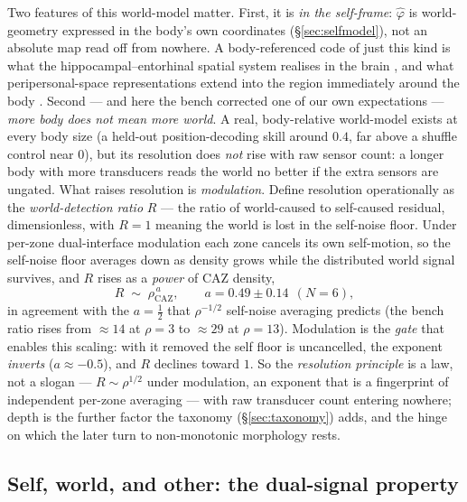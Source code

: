 \documentclass{article}
\begin{document}
Two features of this world-model matter.  First, it is \emph{in the
self-frame}: $\hat\varphi$ is world-geometry expressed in the body's own
coordinates (\S\ref{sec:selfmodel}), not an absolute map read off from
nowhere.  A body-referenced code of just this kind is what the
hippocampal--entorhinal spatial system realises in the brain
\citep{OKeefeNadel1978CognitiveMap,MoserKropffMoser2008SpatialSystem}, and
what peripersonal-space representations extend into the region immediately
around the body \citep{GrazianoCooke2006PersonalSpace}.  Second --- and here the bench corrected one of our own
expectations --- \emph{more body does not mean more world}.  A real,
body-relative world-model exists at every body size (a held-out
position-decoding skill around $0.4$, far above a shuffle control near
$0$), but its resolution does \emph{not} rise with raw sensor count: a
longer body with more transducers reads the world no better if the extra
sensors are ungated.  What raises resolution is \emph{modulation}.  Define resolution
operationally as the \emph{world-detection ratio} $R$ --- the ratio of
world-caused to self-caused residual, dimensionless, with $R{=}1$ meaning
the world is lost in the self-noise floor.  Under per-zone dual-interface
modulation each zone cancels its own self-motion, so the self-noise floor
averages down as density grows while the distributed world signal
survives, and $R$ rises as a \emph{power} of CAZ density,
\begin{equation}
R \;\sim\; \rho_{\mathrm{CAZ}}^{\,a},
\qquad a = 0.49 \pm 0.14\ \ (N{=}6),
\label{eq:resolution}
\end{equation}
in agreement with the $a{=}\tfrac12$ that $\rho^{-1/2}$ self-noise
averaging predicts (the bench ratio rises from $\approx\!14$ at
$\rho{=}3$ to $\approx\!29$ at $\rho{=}13$).  Modulation is the \emph{gate}
that enables this scaling: with it removed the self floor is uncancelled,
the exponent \emph{inverts} ($a\approx-0.5$), and $R$ declines toward $1$.
So the \emph{resolution principle} is a law, not a slogan --- $R\sim
\rho^{1/2}$ under modulation, an exponent that is a fingerprint of
independent per-zone averaging --- with raw transducer count entering
nowhere; depth is the further factor the taxonomy (\S\ref{sec:taxonomy})
adds, and the hinge on which the later turn to non-monotonic morphology
rests.

\subsection{Self, world, and other: the dual-signal property}\label{sec:world-dualsignal}
\end{document}
